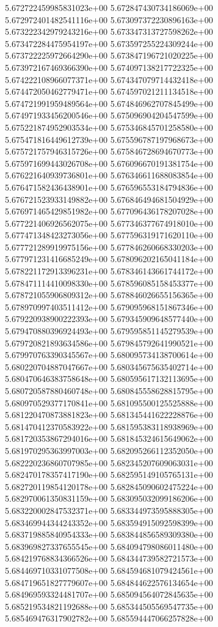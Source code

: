 5.672722459985831023e+00
5.672847430734186069e+00
5.672972401482541116e+00
5.673097372230896163e+00
5.673222342979243216e+00
5.673347313727598262e+00
5.673472284475954197e+00
5.673597255224309244e+00
5.673722225972664290e+00
5.673847196721020225e+00
5.673972167469366390e+00
5.674097138217722325e+00
5.674222108966077371e+00
5.674347079714432418e+00
5.674472050462779471e+00
5.674597021211134518e+00
5.674721991959489564e+00
5.674846962707845499e+00
5.674971933456200546e+00
5.675096904204547599e+00
5.675221874952903534e+00
5.675346845701258580e+00
5.675471816449612739e+00
5.675596787197968673e+00
5.675721757946315726e+00
5.675846728694670773e+00
5.675971699443026708e+00
5.676096670191381754e+00
5.676221640939736801e+00
5.676346611688083854e+00
5.676471582436438901e+00
5.676596553184794836e+00
5.676721523933149882e+00
5.676846494681504929e+00
5.676971465429851982e+00
5.677096436178207028e+00
5.677221406926562075e+00
5.677346377674918010e+00
5.677471348423273056e+00
5.677596319171620110e+00
5.677721289919975156e+00
5.677846260668330203e+00
5.677971231416685249e+00
5.678096202165041184e+00
5.678221172913396231e+00
5.678346143661744172e+00
5.678471114410098330e+00
5.678596085158453377e+00
5.678721055906809312e+00
5.678846026655156365e+00
5.678970997403511412e+00
5.679095968151867346e+00
5.679220938900222393e+00
5.679345909648577440e+00
5.679470880396924493e+00
5.679595851145279539e+00
5.679720821893634586e+00
5.679845792641990521e+00
5.679970763390345567e+00
5.680095734138700614e+00
5.680220704887047667e+00
5.680345675635402714e+00
5.680470646383758648e+00
5.680595617132113695e+00
5.680720587880460748e+00
5.680845558628815795e+00
5.680970529377170841e+00
5.681095500125525888e+00
5.681220470873881823e+00
5.681345441622228876e+00
5.681470412370583922e+00
5.681595383118938969e+00
5.681720353867294016e+00
5.681845324615649062e+00
5.681970295363997003e+00
5.682095266112352050e+00
5.682220236860707985e+00
5.682345207609063031e+00
5.682470178357417190e+00
5.682595149105765131e+00
5.682720119854120178e+00
5.682845090602475224e+00
5.682970061350831159e+00
5.683095032099186206e+00
5.683220002847532371e+00
5.683344973595888305e+00
5.683469944344243352e+00
5.683594915092598399e+00
5.683719885840954333e+00
5.683844856589309380e+00
5.683969827337655545e+00
5.684094798086011480e+00
5.684219768834366526e+00
5.684344739582721573e+00
5.684469710331077508e+00
5.684594681079424561e+00
5.684719651827779607e+00
5.684844622576134654e+00
5.684969593324481707e+00
5.685094564072845635e+00
5.685219534821192688e+00
5.685344505569547735e+00
5.685469476317902782e+00
5.685594447066257828e+00
